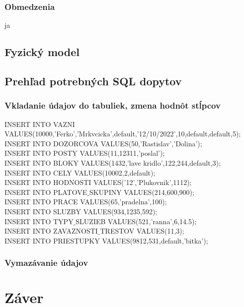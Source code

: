 \documentclass[slovak, 12pt, Times New Roman]{article}
\begin{document}
			\subsubsection{Obmedzenia}
				ja
		\subsection{Fyzický model}
		\subsection{Prehľad potrebných SQL dopytov}
			\subsubsection{Vkladanie údajov do tabuliek, zmena hodnôt stĺpcov}
				INSERT INTO VAZNI VALUES(10000,'Ferko','Mrkvcicka',default,'12/10/2022',10,default,default,5);\\
				INSERT INTO DOZORCOVA VALUES(50,'Rastislav','Dolina');\\
				INSERT INTO POSTY VALUES(11,12311,'poslal');\\
				INSERT INTO BLOKY VALUES(1432,'lave kridlo',122,244,default,3);\\
				INSERT INTO CELY VALUES(10002,2,default);\\
				INSERT INTO HODNOSTI VALUES('12','Plukovnik',1112);\\
				INSERT INTO PLATOVE$\_$SKUPINY VALUES(214,600,900);\\
				INSERT INTO PRACE VALUES(65,'pradelna',100);\\
				INSERT INTO SLUZBY VALUES(934,1235,592);\\
				INSERT INTO TYPY$\_$SLUZIEB VALUES(521,'ranna',6,14.5);\\
				INSERT INTO ZAVAZNOSTI$\_$TRESTOV VALUES(11,3);\\
				INSERT INTO PRIESTUPKY VALUES(9812,531,default,'bitka');\\
			\subsubsection{Vymazávanie údajov}
	\section{Záver}
\end{document}

